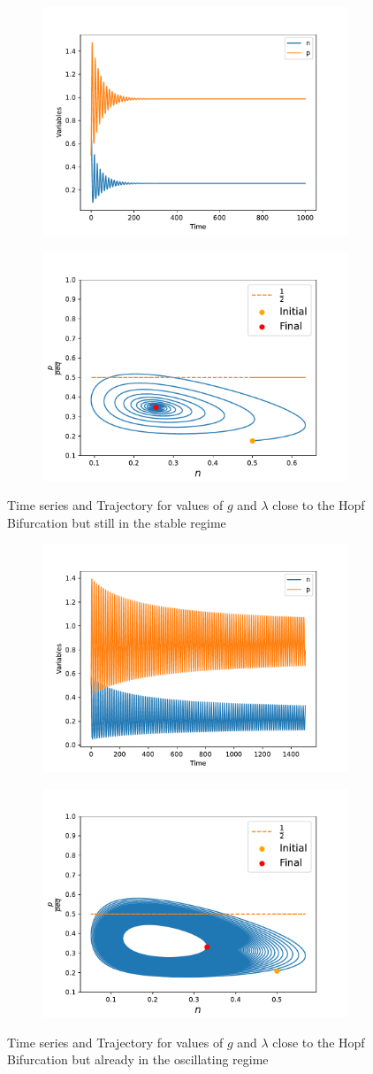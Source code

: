 \documentclass{article}
\begin{document}
	\hfill \break
	
	\begin{figure}[H]
		
		\begin{subfigure}{\textwidth}
			\includegraphics[width=0.5\linewidth]{timeseries.pdf} 
		\end{subfigure}
		\begin{subfigure}{\textwidth}
			\includegraphics[width=0.5\linewidth]{traj.pdf} 
		\end{subfigure}
		\caption{\small{Time series and Trajectory for values of $g$ and $\lambda$  close to the Hopf Bifurcation but still in the stable regime}}
	\end{figure}
	\begin{figure}[H]
		\begin{subfigure}{\textwidth}
			\includegraphics[width=0.5\linewidth]{timeseries1.pdf}
		\end{subfigure}
		\begin{subfigure}{\textwidth}
			\includegraphics[width=0.5\linewidth]{traj1.pdf}
		\end{subfigure}
		\caption{\small{Time series and Trajectory for values of $g$ and $\lambda$  close to the Hopf Bifurcation but already in the oscillating regime}}
	\end{figure}
\end{document}
